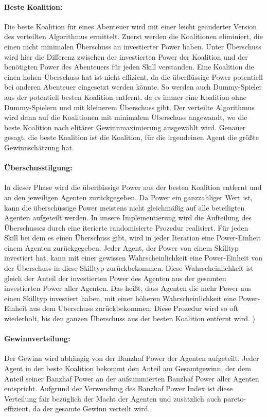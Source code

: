 \documentclass[fleqn,10pt]{SelfArx} %
\begin{document}
\paragraph{Beste Koalition:}
Die beste Koalition für eines Abenteuer wird mit einer leicht geänderter Version des verteilten Algorithmus ermittelt. Zuerst werden die Koalitionen eliminiert, die einen nicht minimalen Überschuss an investierter Power haben. Unter Überschuss wird hier die Differenz zwischen der investierten Power der Koalition und der benötigten Power des Abenteuers für jeden Skill verstanden. Eine Koalition die einen hohen Überschuss hat ist nicht effizient, da die überflüssige Power potentiell bei anderen Abenteuer eingesetzt werden könnte. So werden auch Dummy-Spieler aus der potentiell besten Koalition entfernt, da es immer eine Koalition ohne Dummy-Spielern und mit kleinerem Überschuss gibt. Der verteilte Algorithmus wird dann auf die Koalitionen mit minimalem Überschuss angewandt, wo die beste Koalition nach elitärer Gewinnmaximierung ausgewählt wird. Genauer gesagt, die beste Koalition ist die Koalition, für die irgendeinen Agent die größte Gewinnschätzung hat.

\paragraph{Überschusstilgung:} 
In dieser Phase wird die überflüssige Power aus der besten Koalition entfernt und an den jeweiligen Agenten zurückgegeben. Da Power ein ganzzahliger Wert ist, kann die überschüssige Power meistens nicht gleichmäßig auf alle beteiligten Agenten aufgeteilt werden. In unsere Implementierung wird die Aufteilung des Überschusses durch eine iterierte randomisierte Prozedur realisiert. Für jeden Skill bei dem es einen Überschuss gibt, wird in jeder Iteration eine Power-Einheit einem Agenten zurückgegeben. Jeder Agent, der Power von einem Skilltyp investiert hat, kann mit einer gewissen Wahrscheinlichkeit eine Power-Einheit von der Überschuss in diese Skilltyp zurückbekommen. Diese Wahrscheinlichkeit ist gleich der Anteil der investierten Power des Agenten aus der gesamten investierten Power aller Agenten. Das heißt, dass Agenten die mehr Power aus einen Skilltyp investiert haben, mit einer höheren Wahrscheinlichkeit eine Power-Einheit aus dem Überschuss zurückbekommen. Diese Prozedur wird so oft wiederholt, bis den ganzen Überschuss aus der besten Koalition entfernt wird.
)
\paragraph{Gewinnverteilung:}
Der Gewinn wird abhängig von der Banzhaf Power der Agenten aufgeteilt. Jeder Agent in der beste Koalition bekommt den Anteil am Gesamtgewinn, der dem Anteil seiner Banzhaf Power an der aufsummierten Banzhaf Power aller Agenten entspricht. Aufgrund der Verwendung des Banzhaf Power Index ist diese Verteilung fair bezüglich der Macht der Agenten und zusätzlich auch pareto-effizient, da der gesamte Gewinn verteilt wird.
\end{document}

